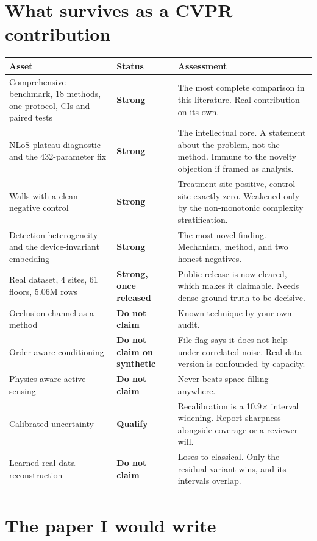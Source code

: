 \documentclass[10pt,a4paper]{article}
\newcommand{\B}[1]{\textcolor{bad}{\textbf{#1}}}
\newcommand{\G}[1]{\textcolor{good}{\textbf{#1}}}
\begin{document}
\section{What survives as a CVPR contribution}

\begin{center}\small
\begin{tabular}{@{}p{5.2cm}p{2.2cm}p{9.2cm}@{}}
\toprule
Asset & Status & Assessment \\ \midrule
Comprehensive benchmark, 18 methods, one protocol, CIs and paired tests & \G{Strong} &
The most complete comparison in this literature. Real contribution on its own. \\
NLoS plateau diagnostic and the 432-parameter fix & \G{Strong} &
The intellectual core. A statement about the problem, not the method. Immune to the
novelty objection if framed as analysis. \\
Walls with a clean negative control & \G{Strong} & Treatment site positive, control site
exactly zero. Weakened only by the non-monotonic complexity stratification. \\
Detection heterogeneity and the device-invariant embedding & \G{Strong} & The most novel
finding. Mechanism, method, and two honest negatives. \\
Real dataset, 4 sites, 61 floors, 5.06M rows & \G{Strong, once released} & Public release
is now cleared, which makes it claimable. Needs dense ground truth to be decisive. \\
Occlusion channel as a method & \B{Do not claim} & Known technique by your own audit. \\
Order-aware conditioning & \B{Do not claim on synthetic} & File flag says it does not
help under correlated noise. Real-data version is confounded by capacity. \\
Physics-aware active sensing & \B{Do not claim} & Never beats space-filling anywhere. \\
Calibrated uncertainty & \textcolor{orange!80!black}{\textbf{Qualify}} & Recalibration is
a 10.9$\times$ interval widening. Report sharpness alongside coverage or a reviewer will. \\
Learned real-data reconstruction & \B{Do not claim} & Loses to classical. Only the
residual variant wins, and its intervals overlap. \\
\bottomrule
\end{tabular}
\end{center}

\section{The paper I would write}
\end{document}
